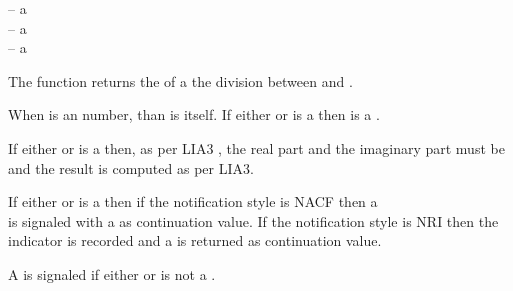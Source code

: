 \documentclass[../Comparisons-Predicates.tex]{subfiles}
\begin{document}
  
  \DSyntax{}
  
     \RArrow {}
  
  \DArgsNValues{}
  
   -- a \\
   -- a \\
   -- a 
  
  
  \DDescription{}
  
  The  function returns the 
   of a the division between  and .
  
  When  is an  number, than 
  is  itself.  If either  or  is a
   then  is a .
  
  If either  or  is a 
  then, as per LIA3 \cite{2004:LIA3}, the real part and the imaginary
  part must be  and the result  is
  computed as per LIA3.
  
  
  \DExceptional{}
  
  If either  or  is a 
  then if the notification style is NACF then a\\
   is signaled with a
   as continuation value.  If the notification
  style is NRI then the  indicator is recorded and a
   is returned as continuation value.
  
  A  is signaled if either  or  is
  not a .
  
\end{document}
